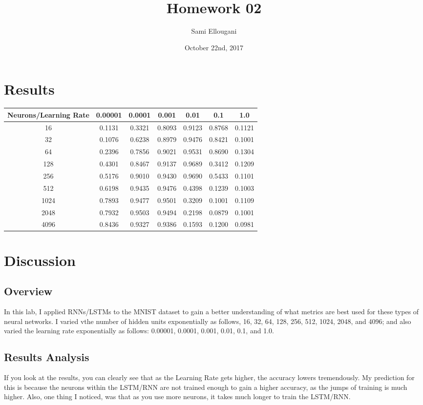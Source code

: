 \documentclass[a4paper]{article}
\title{Homework 02}
\author{Sami Ellougani}
\date{October 22nd, 2017}
\begin{document}
\maketitle

\section{Results}

\begin{table}[h!]
\centering
\begin{tabular}{||c c c c c c c||} 
 \hline
 Neurons/Learning Rate & 0.00001 & 0.0001 & 0.001 & 0.01 & 0.1 & 1.0 \\ [0.5ex] 
 \hline\hline
 16 & 0.1131 & 0.3321 & 0.8093 & 0.9123 & 0.8768 & 0.1121 \\ 
 32 & 0.1076 & 0.6238 & 0.8979 & 0.9476 & 0.8421 & 0.1001\\
 64 & 0.2396 & 0.7856 & 0.9021 & 0.9531 & 0.8690 & 0.1304\\
 128 & 0.4301 & 0.8467 & 0.9137 & 0.9689 & 0.3412 & 0.1209\\
 256 & 0.5176 & 0.9010 & 0.9430 & 0.9690 & 0.5433 & 0.1101\\ 
 512 & 0.6198 & 0.9435 & 0.9476 & 0.4398 & 0.1239 & 0.1003\\
 1024 & 0.7893 & 0.9477 & 0.9501 & 0.3209 & 0.1001 & 0.1109\\
 2048 & 0.7932 & 0.9503 & 0.9494 & 0.2198 & 0.0879 & 0.1001\\
 4096 & 0.8436 & 0.9327 & 0.9386 & 0.1593 & 0.1200 & 0.0981\\ [1ex]
 \hline
\end{tabular}
\label{table:1}
\end{table}

\section{Discussion}
\subsection{Overview}
In this lab, I applied RNNs/LSTMs to the MNIST dataset to gain a better understanding of what metrics are best used for these types of neural networks. I varied vthe number of hidden units exponentially as follows, 16, 32, 64, 128, 256, 512, 1024, 2048, and 4096; and also varied the learning rate exponentially as follows: 0.00001, 0.0001, 0.001, 0.01, 0.1, and 1.0. 

\subsection{Results Analysis}
If you look at the results, you can clearly see that as the Learning Rate gets higher, the accuracy lowers tremendously. My prediction for this is because the neurons within the LSTM/RNN are not trained enough to gain a higher accuracy, as the jumps of training is much higher. Also, one thing I noticed, was that as you use more neurons, it takes much longer to train the LSTM/RNN. 
\end{document}
